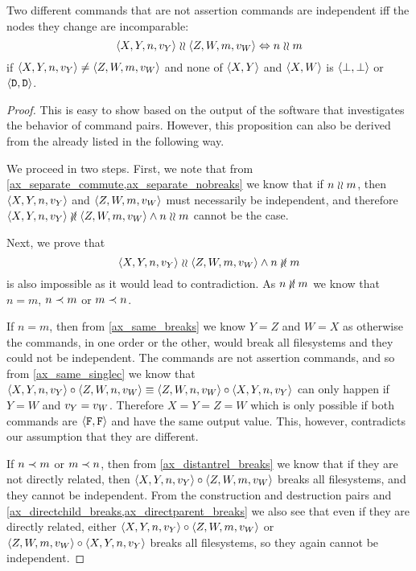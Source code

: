 \begin{mylem}\label{incomparable_is_independent}
Two different commands that are not assertion commands are independent iff the nodes they change are incomparable:
\[ \langle{X,Y,n,v_Y}\rangle\mathrel{\wr\wr}\langle{Z,W,m,v_W}\rangle \Leftrightarrow n\mathrel{\wr\wr} m \]
if $\langle{X,Y,n,v_Y}\rangle\neq\langle{Z,W,m,v_W}\rangle$ and none of $\langle{X,Y}\rangle$ and $\langle{X,W}\rangle$ is $\langle{\bot,\bot}\rangle$ or $\langle{\mathtt{D},\mathtt{D}}\rangle$.
\end{mylem}
\begin{proof}
This is easy to show based on the output of the software that investigates the behavior of command pairs.
However, this proposition can also be derived from the  already listed
in the following way.

We proceed in two steps. First, we note that
from \cref{ax_separate_commute,ax_separate_nobreaks} we know that
if $n\mathrel{\wr\wr} m$, then $\langle{X,Y,n,v_Y}\rangle$ and $\langle{Z,W,m,v_W}\rangle$ must necessarily be independent, and therefore
$ \cxynv\nindep\czwmv \wedge n\unrel m $ cannot be the case.

Next, we prove that
\[ \cxynv\indep\czwmv \wedge n\nunrel m \] is also impossible as it would lead to contradiction.
As $n\nunrel m$
we know that $n=m$, $n\prec m$ or $m\prec n$.

If $n=m$, then from \cref{ax_same_breaks} we know $Y=Z$ and $W=X$
as otherwise the commands, in one order or the other, would break all filesystems
and they could not be independent.
The commands are not assertion commands, and so from \cref{ax_same_singlec}
we know that $\langle{X,Y,n,v_Y}\rangle\circ\langle{Z,W,n,v_W}\rangle\equiv\langle{Z,W,n,v_W}\rangle\circ\langle{X,Y,n,v_Y}\rangle$ can only happen if $Y=W$ and $v_Y=v_W$.
Therefore $X=Y=Z=W$ which is only possible if both commands are $\langle{\mathtt{F},\mathtt{F}}\rangle$ and have the same
output value. This, however, contradicts our assumption that they are different.

If $n\prec m$ or $m\prec n$, then
from \cref{ax_distantrel_breaks} we know that if they are not directly related,
then $\langle{X,Y,n,v_Y}\rangle\circ\langle{Z,W,m,v_W}\rangle$ breaks all filesystems, and they cannot be independent.
From the construction and destruction pairs and 
\cref{ax_directchild_breaks,ax_directparent_breaks} we also see that
even if they are directly related, either
$\langle{X,Y,n,v_Y}\rangle\circ\langle{Z,W,m,v_W}\rangle$ or $\langle{Z,W,m,v_W}\rangle\circ\langle{X,Y,n,v_Y}\rangle$ 
breaks all filesystems, so they again cannot be independent.
\end{proof}

